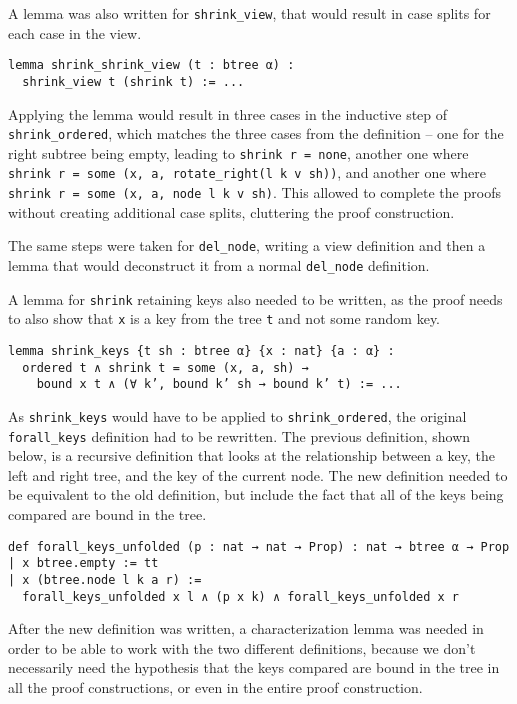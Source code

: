 A lemma was also written for \lstinline{shrink_view}, that would result in case splits for each case in the view. 

\begin{lstlisting}
lemma shrink_shrink_view (t : btree α) : 
  shrink_view t (shrink t) := ...
\end{lstlisting}

Applying the lemma would result in three cases in the inductive step of \lstinline{shrink_ordered}, which matches the three cases from the definition -- one for the right subtree being empty, leading to \lstinline{shrink r = none}, another one where \lstinline{shrink r = some (x, a, rotate_right(l k v sh))}, and another one where \lstinline{shrink r = some (x, a, node l k v sh)}. This allowed to complete the proofs without creating additional case splits, cluttering the proof construction.

The same steps were taken for \lstinline{del_node}, writing a view definition and then a lemma that would deconstruct it from a normal \lstinline{del_node} definition.

A lemma for \lstinline{shrink} retaining keys also needed to be written, as the proof needs to also show that \lstinline{x} is a key from the tree \lstinline{t} and not some random key.

\begin{lstlisting}
lemma shrink_keys {t sh : btree α} {x : nat} {a : α} :
  ordered t ∧ shrink t = some (x, a, sh) →
    bound x t ∧ (∀ k’, bound k’ sh → bound k’ t) := ...
\end{lstlisting}

As \lstinline{shrink_keys} would have to be applied to \lstinline{shrink_ordered}, the original \lstinline{forall_keys} definition had to be rewritten. The previous definition, shown below, is a recursive definition that looks at the relationship between a key, the left and right tree, and the key of the current node. The new definition needed to be equivalent to the old definition, but include the fact that all of the keys being compared are bound in the tree. 

\begin{lstlisting}
def forall_keys_unfolded (p : nat → nat → Prop) : nat → btree α → Prop
| x btree.empty := tt
| x (btree.node l k a r) :=
  forall_keys_unfolded x l ∧ (p x k) ∧ forall_keys_unfolded x r
\end{lstlisting}

After the new definition was written, a characterization lemma was needed in order to be able to work with the two different definitions, because we don't necessarily need the hypothesis that the keys compared are bound in the tree in all the proof constructions, or even in the entire proof construction.

